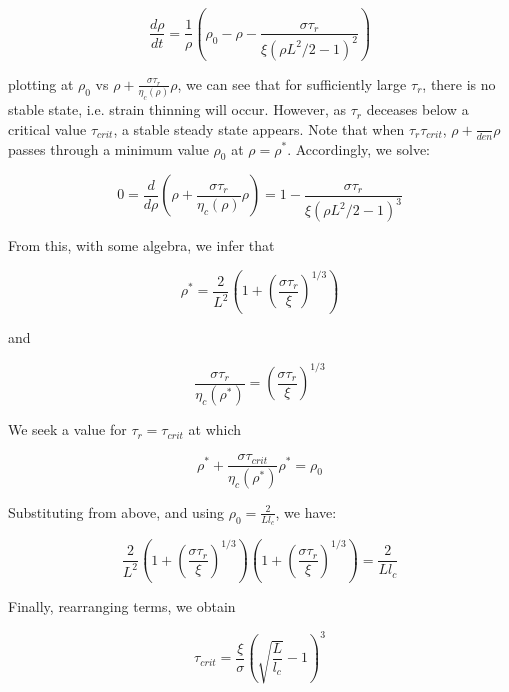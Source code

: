 \documentclass[10pt,letterpaper]{article}
\begin{document}
\begin{equation}
\label{drho_2}
\frac{d\rho}{dt}=\frac{1}{\rho}\left ( \rho_0 - \rho - \frac{\sigma \tau_r}{\xi(\rho L^2/2 -1)^2}\right )
\end{equation}

plotting at $\rho_0$ vs $\rho+\frac{\sigma \tau_r}{\eta_c(\rho)}\rho$, we can see that for sufficiently large $\tau_r$, there is no stable state, i.e. strain thinning will occur.  However, as $\tau_r$ deceases below a critical value $\tau_{crit}$, a stable steady state appears.  Note that when $\tau_r  \tau_{crit}$, $\rho+\frac{}{den}\rho$ passes through a minimum value $\rho_0$ at $\rho=\rho^*$.  Accordingly, we solve:

\begin{equation}
\label{drho_3}
0 = \frac{d}{d\rho}\left( \rho + \frac{\sigma\tau_r}{\eta_c(\rho)} \rho\right ) = 1 - \frac{\sigma\tau_r}{\xi (\rho L^2/2-1)^3}
\end{equation}

From this, with some algebra, we infer that

\begin{equation}
\label{drho_4}
\rho^* = \frac{2}{L^2}\left ( 1 + \left( \frac{\sigma\tau_r}{\xi}\right )^{1/3} \right )
\end{equation}

and 

\begin{equation}
\label{drho_5}
\frac{\sigma\tau_r}{\eta_c(\rho^*)} =  \left( \frac{\sigma\tau_r}{\xi}\right )^{1/3} 
\end{equation}

We seek a value for $\tau_r=\tau_{crit}$ at which


\begin{equation}
\label{drho_6}
\rho^* + \frac{\sigma\tau_{crit}}{\eta_c(\rho^*)}\rho^* =  \rho_0
\end{equation}

Substituting from above, and using $\rho_0=\frac{2}{L l_c}$, we have:

\begin{equation}
\label{drho_7}
\frac{2}{L^2}\left ( 1 + \left( \frac{\sigma\tau_r}{\xi}\right )^{1/3}  \right )
\left ( 1 + \left( \frac{\sigma\tau_r}{\xi}\right )^{1/3}  \right )
= \frac{2}{L l_c}
\end{equation}

Finally, rearranging terms, we obtain

\begin{equation}
\label{drho_8}
\tau_{crit}=\frac{\xi}{\sigma}\left( \sqrt{\frac{L}{l_c}}-1\right )^3
\end{equation}
\end{document}
